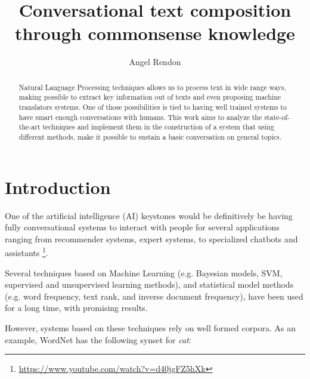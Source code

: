 \documentclass[runningheads]{llncs}
\begin{document}
%
\title{Conversational text composition through commonsense knowledge}
%
%
\author{Angel Rendon}
%
%
%
\maketitle              %
%
\begin{abstract}
Natural Language Processing techniques allows us to process text in wide range ways, making possible to extract key information out of texts and even proposing machine translators systems. One of those possibilities is tied to having well trained systems to have smart enough conversations with humans. This work aims to analyze the state-of-the-art techniques and implement them in the construction of a system that using different methods, make it possible to sustain a basic conversation on general topics.

\end{abstract}
%

\section{Introduction}
One of the artificial intelligence (AI) keystones would be definitively be having fully conversational systems to interact with people for several applications ranging from recommender systems, expert systems, to specialized chatbots and assistants \footnote{\url{https://www.youtube.com/watch?v=d40jgFZ5hXk}}.

Several techniques based on Machine Learning (e.g. Bayesian models, SVM, supervised and unsupervised learning methods), and statistical model methods (e.g. word frequency, text rank, and inverse document frequency), have been used for a long time, with promising results.

However, systems based on these techniques rely on well formed corpora. As an example, WordNet \cite{Miller1990} has the following synset for \emph{cat}:
\end{document}
